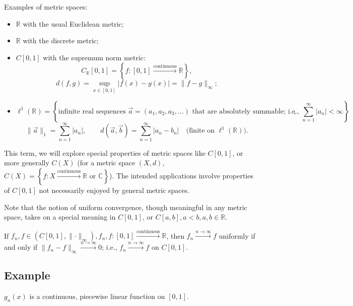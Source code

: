 \documentclass[letterpaper, reqno,11pt]{article}
\newcommand{\RR}{\mathbb{R}}
\newcommand{\CC}{\mathbb{C}}
\begin{document}
Examples of metric spaces:
\begin{itemize}
\item $\RR$ with the usual Euclidean metric;
\item $\RR$ with the discrete metric;
\item $C[0, 1]$ with the supremum norm metric:
  $$ C_\RR [0, 1] = \left\{ f : [0, 1] \xrightarrow{\text{continuous}} \RR \right\}, $$
  $$ d(f, g) = \sup_{x \in [0, 1]} |f(x) - g(x)| = \lVert f - g \rVert_\infty; $$
\item
  $$ \ell^1(\RR) = \left\{ \text{infinite real sequences $\vec a = (a_1, a_2, a_3, \ldots)$ that are absolutely summable; i.e., $\sum_{n = 1}^\infty |a_n| < \infty$} \right\}, $$
  $$ \lVert \vec a \rVert_1 = \sum_{n = 1}^\infty |a_n|, \qquad d(\vec a, \vec b) = \sum_{n = 1}^\infty |a_n - b_n| \quad \text{(finite on $\ell^1(\RR)$)}. $$
\end{itemize}

This term, we will explore special properties of metric spaces like $C[0, 1]$, or more generally $C(X)$ (for a metric space $(X, d)$, $C(X) = \left\{ f : X \xrightarrow{\text{continuous}} \RR \text{ or } \CC \right\}$). The intended applications involve properties of $C[0, 1]$ not necessarily enjoyed by general metric spaces.

\begin{remark}
  \normalfont Note that the notion of uniform convergence, though meaningful in any metric space, takes on a special meaning in $C[0, 1]$, or $C[a, b], a < b, a, b \in \RR$.

  If $f_n, f \in (C[0, 1], \lVert \cdot \rVert_\infty), f_n, f : [0, 1] \xrightarrow{\text{continuous}} \RR$, then $f_n \xrightarrow{n \to \infty} f$ uniformly if and only if $\lVert f_n - f \rVert_\infty \xrightarrow{n \to \infty} 0$; i.e., $f_n \xrightarrow{n \to \infty} f$ on $C[0, 1]$.
\end{remark}

\subsection{Example}

$g_n(x)$ is a continuous, piecewise linear function on $[0, 1]$.

\begin{figure}[H]
  \centering
\end{figure}
\end{document}
